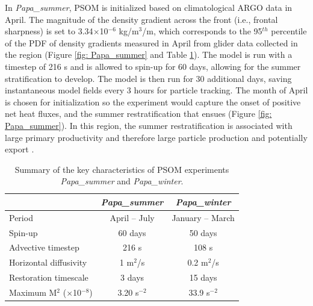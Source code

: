 \documentclass[draft,linenumbers]{agujournal2018}
\begin{document}
In \textit{Papa\_summer}, PSOM is initialized based on climatological ARGO data in April. The magnitude of the density gradient across the front (i.e., frontal sharpness) is set to 3.34$\times$10$^{-6}$ kg/m$^3$/m, which corresponds to the 95$^{th}$ percentile of the PDF of density gradients measured in April from glider data collected in the region (Figure \ref{fig: Papa_summer} and Table \ref{tab: meso_vs_submeso}). The model is run with a timestep of 216 s and is allowed to spin-up for 60 days, allowing for the summer stratification to develop. The model is then run for 30 additional days, saving instantaneous model fields every 3 hours for particle tracking. The month of April is chosen for initialization so the experiment would capture the onset of positive net heat fluxes, and the summer restratification that ensues (Figure \ref{fig: Papa_summer}). In this region, the summer restratification is associated with large primary productivity and therefore large particle production and potentially export \citep[e.g., fecal pallets, dead phytoplankter; ][]{Plant_2016}.

\begin{table}[ht]
\caption{Summary of the key characteristics of PSOM experiments \textit{Papa\_summer} and \textit{Papa\_winter}.}
	\label{tab: meso_vs_submeso}
	\centering
 \centering
\begin{tabular}{|l|c|c|}
		\hline
											& \textit{Papa\_summer} & \textit{Papa\_winter} \\
		\hline
		Period 								& April -- July         & January -- March      \\
		Spin-up								& 60 days               & 50 days               \\
		Advective timestep				    & 216 s                 & 108 s                 \\
		Horizontal diffusivity			    & 1 m$^2$/s             & 0.2 m$^2$/s           \\
		Restoration timescale			    & 3 days                & 15 days               \\
		Maximum M$^2$ ($\times$10$^{-8}$)	& 3.20 s$^{-2}$         & 33.9 s$^{-2}$         \\	
		\hline
	\end{tabular}
\end{table}

\end{document}
